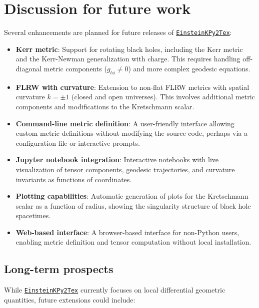 \documentclass[11pt,a4paper]{article}
\begin{document}
\section{Discussion for future work}

Several enhancements are planned for future releases of \href{https://github.com/lontelis/Einsteinpy_to_latex}{{\color{cyan}\texttt{EinsteinKPy2Tex}}}:

\begin{itemize}
    \item \textbf{Kerr metric}: Support for rotating black holes, including the Kerr metric and the Kerr-Newman generalization with charge. This requires handling off-diagonal metric components ($g_{t\phi} \neq 0$) and more complex geodesic equations.

    \item \textbf{FLRW with curvature}: Extension to non-flat FLRW metrics with spatial curvature $k = \pm 1$ (closed and open universes). This involves additional metric components and modifications to the Kretschmann scalar.

    \item \textbf{Command-line metric definition}: A user-friendly interface allowing custom metric definitions without modifying the source code, perhaps via a configuration file or interactive prompts.

    \item \textbf{Jupyter notebook integration}: Interactive notebooks with live visualization of tensor components, geodesic trajectories, and curvature invariants as functions of coordinates.

    \item \textbf{Plotting capabilities}: Automatic generation of plots for the Kretschmann scalar as a function of radius, showing the singularity structure of black hole spacetimes.

    \item \textbf{Web-based interface}: A browser-based interface for non-Python users, enabling metric definition and tensor computation without local installation.
\end{itemize}

\subsection{Long-term prospects}

While \href{https://github.com/lontelis/Einsteinpy_to_latex}{{\color{cyan}\texttt{EinsteinKPy2Tex}}} currently focuses on local differential geometric quantities, future extensions could include:
\end{document}
